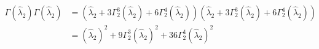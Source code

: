 \documentclass[aps,preprint]{revtex4}%
\begin{document}
\bigskip%

\begin{align}
\Gamma\left(  \hat{\lambda}_{2}\right)  \Gamma\left(  \hat{\lambda}%
_{2}\right)    & =\left(  \hat{\lambda}_{2}+3\Gamma_{2}^{3}\left(
\hat{\lambda}_{2}\right)  +6\Gamma_{2}^{4}\left(  \hat{\lambda}_{2}\right)
\right)  \left(  \hat{\lambda}_{2}+3\Gamma_{2}^{3}\left(  \hat{\lambda}%
_{2}\right)  +6\Gamma_{2}^{4}\left(  \hat{\lambda}_{2}\right)  \right)
\nonumber\\
& =\left(  \hat{\lambda}_{2}\right)  ^{2}+9\Gamma_{2}^{3}\left(  \hat{\lambda
}_{2}\right)  ^{2}+36\Gamma_{2}^{4}\left(  \hat{\lambda}_{2}\right)  ^{2}%
\end{align}
\end{document}
